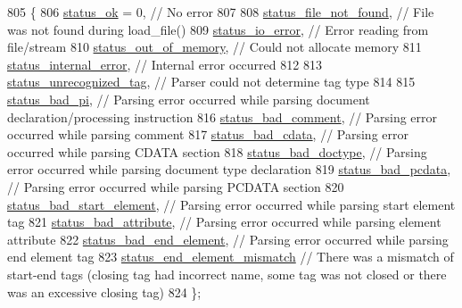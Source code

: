 \begin{DoxyCode}
805     \{
806         \hyperlink{namespacepugi_a9054ca609e12afb8f3e5892fc6c0b555a46ddc2abb6a54fdac07cf9086b45f10f}{status\_ok} = 0,             \textcolor{comment}{// No error}
807 
808         \hyperlink{namespacepugi_a9054ca609e12afb8f3e5892fc6c0b555a32e05bc1b1356846e6a5fb0ec097d36b}{status\_file\_not\_found},     \textcolor{comment}{// File was not found during load\_file()}
809         \hyperlink{namespacepugi_a9054ca609e12afb8f3e5892fc6c0b555a28bb6318a65eec5abcf1ef8174b92246}{status\_io\_error},         \textcolor{comment}{// Error reading from file/stream}
810         \hyperlink{namespacepugi_a9054ca609e12afb8f3e5892fc6c0b555a59e75d024e9f5c213ca6f4db8102b978}{status\_out\_of\_memory},       \textcolor{comment}{// Could not allocate memory}
811         \hyperlink{namespacepugi_a9054ca609e12afb8f3e5892fc6c0b555a37a3c224657a16f27c950ec70954c981}{status\_internal\_error},     \textcolor{comment}{// Internal error occurred}
812 
813         \hyperlink{namespacepugi_a9054ca609e12afb8f3e5892fc6c0b555a71a555b91e80b6d8f84aeb6a93904d28}{status\_unrecognized\_tag}, \textcolor{comment}{// Parser could not determine tag type}
814 
815         \hyperlink{namespacepugi_a9054ca609e12afb8f3e5892fc6c0b555ad7a57e8554aabea52ed8b0d6a0891622}{status\_bad\_pi},             \textcolor{comment}{// Parsing error occurred while parsing document
       declaration/processing instruction}
816         \hyperlink{namespacepugi_a9054ca609e12afb8f3e5892fc6c0b555a563327f534e9b3ce55f9f7364aa746b2}{status\_bad\_comment},           \textcolor{comment}{// Parsing error occurred while parsing comment}
817         \hyperlink{namespacepugi_a9054ca609e12afb8f3e5892fc6c0b555aa2ebdaf5e8bf5414bec3004270e102b8}{status\_bad\_cdata},           \textcolor{comment}{// Parsing error occurred while parsing CDATA section}
818         \hyperlink{namespacepugi_a9054ca609e12afb8f3e5892fc6c0b555a58d1b0d8787e97fc1b5b31ec5e4fabcf}{status\_bad\_doctype},           \textcolor{comment}{// Parsing error occurred while parsing document
       type declaration}
819         \hyperlink{namespacepugi_a9054ca609e12afb8f3e5892fc6c0b555ac5257467a3d1a971134c457066b21ee5}{status\_bad\_pcdata},         \textcolor{comment}{// Parsing error occurred while parsing PCDATA section}
820         \hyperlink{namespacepugi_a9054ca609e12afb8f3e5892fc6c0b555a3cf4e84a5b433ce50e6f3037df5c1bdd}{status\_bad\_start\_element},   \textcolor{comment}{// Parsing error occurred while parsing start
       element tag}
821         \hyperlink{namespacepugi_a9054ca609e12afb8f3e5892fc6c0b555a2b34aa9968d63b28a6d51b30575ff95a}{status\_bad\_attribute},       \textcolor{comment}{// Parsing error occurred while parsing element
       attribute}
822         \hyperlink{namespacepugi_a9054ca609e12afb8f3e5892fc6c0b555a261cbf22c7da45388bcc1e6759020790}{status\_bad\_end\_element},       \textcolor{comment}{// Parsing error occurred while parsing end
       element tag}
823         \hyperlink{namespacepugi_a9054ca609e12afb8f3e5892fc6c0b555a07a5f6f8392474ccb2d5dc10fe2307a2}{status\_end\_element\_mismatch} \textcolor{comment}{// There was a mismatch of start-end tags
       (closing tag had incorrect name, some tag was not closed or there was an excessive closing tag)}
824     \};
\end{DoxyCode}
